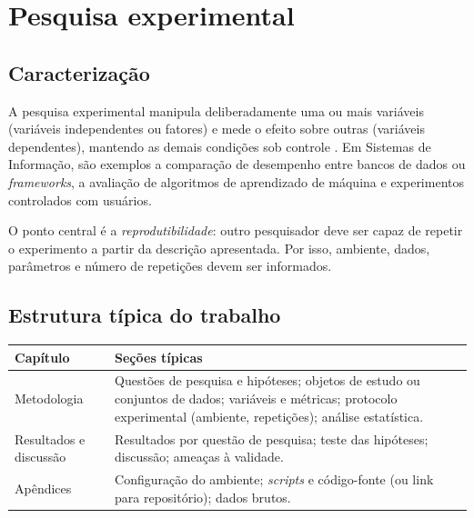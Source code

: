 \section{Pesquisa experimental}
\label{sec_tipo_experimental}

\subsection{Caracterização}

A pesquisa experimental manipula deliberadamente uma ou mais variáveis (variáveis independentes ou fatores) e mede o efeito sobre outras (variáveis dependentes), mantendo as demais condições sob controle \cite{wohlin2012experimentation}. Em Sistemas de Informação, são exemplos a comparação de desempenho entre bancos de dados ou \textit{frameworks}, a avaliação de algoritmos de aprendizado de máquina \cite{Lecun2015DeepLearning} e experimentos controlados com usuários.

O ponto central é a \emph{reprodutibilidade}: outro pesquisador deve ser capaz de repetir o experimento a partir da descrição apresentada. Por isso, ambiente, dados, parâmetros e número de repetições devem ser informados.

\subsection{Estrutura típica do trabalho}

\begin{quadro}[htb]
	\centering
	\caption{Estrutura típica de um TCC de pesquisa experimental.}
	\label{qua_estrutura_experimental}
	\small
	\begin{tabularx}{\textwidth}{|l|X|}
		\hline
		\textbf{Capítulo} & \textbf{Seções típicas} \\ \hline
		Metodologia & Questões de pesquisa e hipóteses; objetos de estudo ou conjuntos de dados; variáveis e métricas; protocolo experimental (ambiente, repetições); análise estatística. \\ \hline
		Resultados e discussão & Resultados por questão de pesquisa; teste das hipóteses; discussão; ameaças à validade. \\ \hline
		Apêndices & Configuração do ambiente; \textit{scripts} e código-fonte (ou link para repositório); dados brutos. \\ \hline
	\end{tabularx}
\end{quadro}

